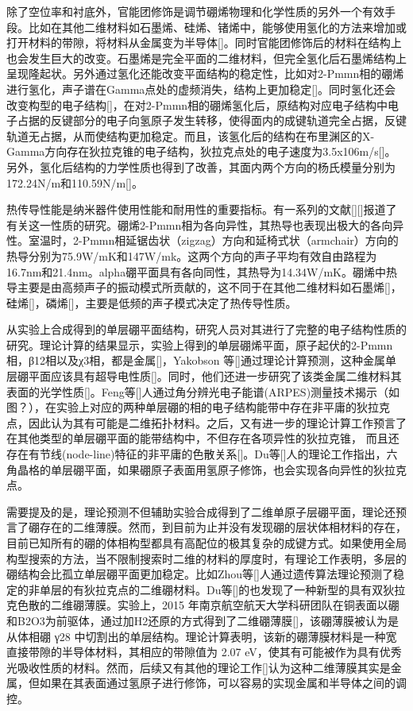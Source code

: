 \documentclass[phd,nobackinfo]{scutthesis}
\begin{document}
除了空位率和衬底外，官能团修饰是调节硼烯物理和化学性质的另外一个有效手段。比如在其他二维材料如石墨烯、硅烯、锗烯中，能够使用氢化的方法来增加或打开材料的带隙，将材料从金属变为半导体[]。同时官能团修饰后的材料在结构上也会发生巨大的改变。石墨烯是完全平面的二维材料，但完全氢化后石墨烯结构上呈现隆起状。另外通过氢化还能改变平面结构的稳定性，比如对2-Pmmn相的硼烯进行氢化，声子谱在Gamma点处的虚频消失，结构上更加稳定[]。同时氢化还会改变构型的电子结构[]，在对2-Pmmn相的硼烯氢化后，原结构对应电子结构中电子占据的反键部分的电子向氢原子发生转移，使得面内的成键轨道完全占据，反键轨道无占据，从而使结构更加稳定。而且，该氢化后的结构在布里渊区的X-Gamma方向存在狄拉克锥的电子结构，狄拉克点处的电子速度为3.5x106m/s[]。另外，氢化后结构的力学性质也得到了改善，其面内两个方向的杨氏模量分别为172.24N/m和110.59N/m[]。

热传导性能是纳米器件使用性能和耐用性的重要指标。有一系列的文献[][]报道了有关这一性质的研究。硼烯2-Pmmn相为各向异性，其热导也表现出极大的各向异性。室温时，2-Pmmn相延锯齿状（zigzag）方向和延椅式状（armchair）方向的热导分别为75.9W/mK和147W/mk。这两个方向的声子平均有效自由路程为16.7nm和21.4nm。alpha硼平面具有各向同性，其热导为14.34W/mK。硼烯中热导主要是由高频声子的振动模式所贡献的，这不同于在其他二维材料如石墨烯[]，硅烯[]，磷烯[]，主要是低频的声子模式决定了热传导性质。

从实验上合成得到的单层硼平面结构，研究人员对其进行了完整的电子结构性质的研究。理论计算的结果显示，实验上得到的单层硼烯平面，原子起伏的2-Pmmn相，β12相以及χ3相，都是金属[]，Yakobson 等[]通过理论计算预测，这种金属单层硼平面应该具有超导电性质[]。同时，他们还进一步研究了该类金属二维材料其表面的光学性质[]。Feng等[]人通过角分辨光电子能谱(ARPES)测量技术揭示（如图？），在实验上对应的两种单层硼的相的电子结构能带中存在非平庸的狄拉克点，因此认为其有可能是二维拓扑材料。之后，又有进一步的理论计算工作预言了在其他类型的单层硼平面的能带结构中，不但存在各项异性的狄拉克锥， 而且还存在有节线(node-line)特征的非平庸的色散关系[]。Du等[]人的理论工作指出，六角晶格的单层硼平面，如果硼原子表面用氢原子修饰，也会实现各向异性的狄拉克点。

需要提及的是，理论预测不但辅助实验合成得到了二维单原子层硼平面，理论还预言了硼存在的二维薄膜。然而，到目前为止并没有发现硼的层状体相材料的存在，目前已知所有的硼的体相构型都具有高配位的极其复杂的成键方式。如果使用全局构型搜索的方法，当不限制搜索时二维的材料的厚度时，有理论工作表明，多层的硼结构会比孤立单层硼平面更加稳定。比如Zhou等[]人通过遗传算法理论预测了稳定的非单层的有狄拉克点的二维硼材料。Du等[]的也发现了一种新型的具有双狄拉克色散的二维硼薄膜。实验上，2015 年南京航空航天大学科研团队在铜表面以硼和B2O3为前驱体，通过加H2还原的方式得到了二维硼薄膜[]，该硼薄膜被认为是从体相硼 γ28 中切割出的单层结构。理论计算表明，该新的硼薄膜材料是一种宽直接带隙的半导体材料，其相应的带隙值为 2.07 eV，使其有可能被作为具有优秀光吸收性质的材料。然而，后续又有其他的理论工作[]认为这种二维薄膜其实是金属，但如果在其表面通过氢原子进行修饰，可以容易的实现金属和半导体之间的调控。
\end{document}
